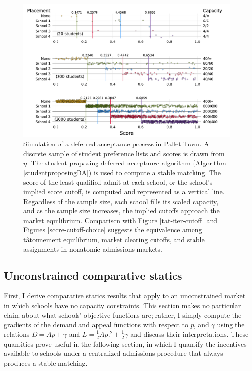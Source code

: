 \documentclass[12pt]{article}
\theoremstyle{definition}
\begin{document}
\begin{figure}
\begin{center}\includegraphics[width=\linewidth, ]{plots/score-DA-placement.pdf}\end{center}
\captionsetup{singlelinecheck=off}
    \caption[.]{Simulation of a deferred acceptance process in Pallet Town. A discrete sample of student preference lists and scores is drawn from $\eta$. The student-proposing deferred acceptance algorithm (Algorithm \ref{studentproposingDA}) is used to compute a stable matching. The score of the least-qualified admit at each school, or the school's implied score cutoff, is computed and represented as a vertical line. Regardless of the sample size, each school fills its scaled capacity, and as the sample size increases, the implied cutoffs approach the market equilibrium. Comparison with Figure \ref{tat-iter-cutoff} and Figures \ref{score-cutoff-choice} suggests the equivalence among t\^{a}tonnement equilibrium, market clearing cutoffs, and stable assignments in nonatomic admissions markets.}
\label{score-DA-placement}
\end{figure}






\subsection{Unconstrained comparative statics}
First, I derive comparative statics results that apply to an unconstrained market in which schools have no capacity constraints. This section makes no particular claim about what schools' objective functions are; rather, I simply compute the gradients of the demand and appeal functions with respect to $p$, and $\gamma$ using the relations $D = Ap + \gamma$ and $L = \frac{1}{2} A p.^2 + \frac{1}{2}\gamma$ and discuss their interpretations. These quantities prove useful in the following section, in which I quantify the incentives available to schools under a centralized admissions procedure that always produces a stable matching. 
\end{document}
